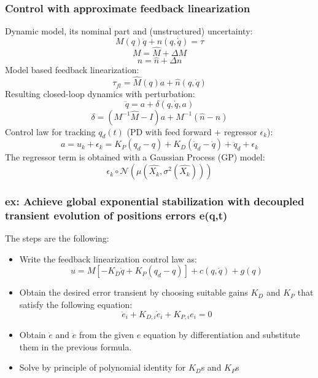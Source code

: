 \documentclass[a4paper,12pt]{article}
\begin{document}
\subsubsection{Control with approximate feedback linearization}
Dynamic model, its nominal part and (unstructured) uncertainty:
\begin{equation}
    M(q)\ddot{q} + n(q,\dot{q}) = \tau 
\end{equation}
\begin{equation}
    M = \hat{M} + \Delta M 
\end{equation}
\begin{equation}
    n = \hat{n} + \Delta n
\end{equation}
Model based feedback linearization:
\begin{equation}
    \tau_{fl} = \hat{M}(q)a + \hat{n}(q,\dot{q}) 
\end{equation}
Resulting closed-loop dynamics with perturbation:
\begin{equation}
\ddot{q}=a + \delta(q,\dot{q},a)
\end{equation}
\begin{equation}
    \delta = (M^{-1}\hat{M}-I)a + M^{-1}(\hat{n}-n)
    \end{equation}
Control law for tracking $q_d(t)$ (PD with feed forward + regressor $\epsilon_k$):
\begin{equation}
    a= u_k + \epsilon_k = K_P(q_d-q) + K_D(\dot{q}_d-\dot{q}) + \ddot{q}_d + \epsilon_k
\end{equation}
The regressor term is obtained with a Gaussian Process (GP) model:
\begin{equation}
    \epsilon_k \circ \mathcal{N}(\mu(\hat{X_k},\sigma^2(\hat{X_k})))
\end{equation}
\subsubsection{ex: Achieve global exponential stabilization with 
decoupled transient evolution of positions errors e(q,t)}
The steps are the following:
\begin{itemize}
\item Write the feedback linearization control law as: \begin{equation}
u=M[-K_D\dot{q}+K_P(q_d-q)]+c(q,\dot{q})+g(q)
\end{equation}
\item Obtain the desired error transient by choosing suitable gains 
$K_D$ and $K_P$ that satisfy the following equation: \begin{equation}
    \ddot{e}_i+K_{D,i}\dot{e}_i+K_{P,i}e_i=0
\end{equation}
\item Obtain $\dot{e}$ and $\ddot{e}$ from the given $e$ equation by differentiation 
and substitute them in the previous formula.
\item Solve by principle of polynomial identity for $K_D$s and $K_P$s
\end{itemize}
\end{document}
